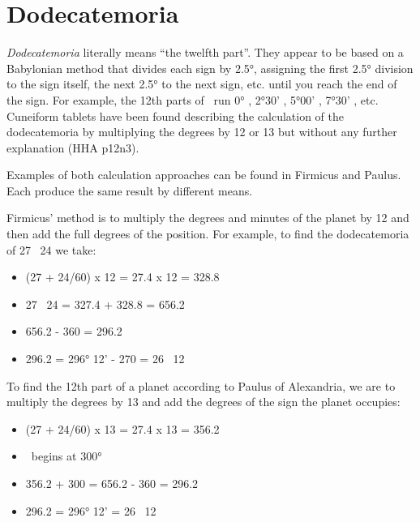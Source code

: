 \chapter{Dodecatemoria}
\label{appendix:dodecatemoria}

\textsl{Dodecatemoria} literally means ``the twelfth part''. They appear to be based on a Babylonian method that divides each sign by  2.5°, assigning the first 2.5° division to the sign itself, the next 2.5° to the next sign, etc. until you reach the end of the sign. For example, the 12th parts of \Libra\, run 0° \Libra, 2°30' \Scorpio, 5°00' \Sagittarius, 7°30' \Capricorn, etc.  Cuneiform tablets have been found describing the calculation of the dodecatemoria by multiplying the degrees by 12 or 13 but without any further explanation (HHA p12n3). 

Examples of both calculation approaches can be found in Firmicus and Paulus. Each produce the same result by different means\footnotemark[1].


Firmicus' method is to multiply the degrees and minutes of the planet  by 12 and then add the full degrees of the position. For example, to find the dodecatemoria of 27 \Aquarius\, 24 we take:
\begin{itemize}
\item[] (27 + 24/60) x 12 = 27.4 x 12 = 328.8
\item[] 27 \Aquarius\ 24 = 327.4 + 328.8 = 656.2
\item[] 656.2 - 360 = 296.2
\item[] 296.2 = 296° 12' - 270 = 26 \Capricorn\, 12
\end{itemize}

To find the 12th part of a planet according to Paulus of Alexandria, we  are to  multiply the degrees by 13 and add the degrees of the sign the planet occupies:
\begin{itemize}
\item[] (27 + 24/60) x 13 = 27.4 x 13 = 356.2
\item[] \Aquarius\, begins at 300°
\item[] 356.2 + 300 = 656.2 - 360 = 296.2
\item[] 296.2 = 296° 12' = 26 \Capricorn\, 12
\end{itemize}

